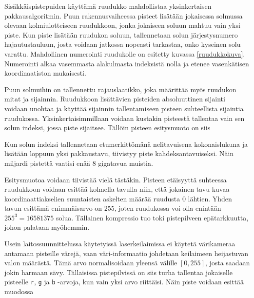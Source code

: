 Sisäkkäispistepuiden käyttämä ruudukko mahdollistaa yksinkertaisen pakkausalgoritmin. Puun rakennusvaiheessa pisteet lisätään jokaisessa solmussa olevaan kolmiulotteiseen ruudukkoon, jonka jokaiseen soluun mahtuu vain yksi piste. Kun piste lisätään ruudukon soluun, tallennetaan solun järjestysnumero hajautustauluun, josta voidaan jatkossa nopeasti tarkastaa, onko kyseinen solu varattu. Mahdollinen numerointi ruudukolle on esitetty kuvassa \ref{ruudukkokuva}. Numerointi alkaa vasemmasta alakulmasta indeksistä nolla ja etenee vasenkätisen koordinaatiston mukaisesti. 

Puun solmuihin on tallennettu rajauslaatikko, joka määrittää myös ruudukon mitat ja sijainnin. Ruudukkoon lisättävien pisteiden absoluuttinen sijainti voidaan unohtaa ja käyttää sijainnin tallentamiseen pisteen suhteellista sijaintia ruudukossa. Yksinkertaisimmillaan voidaan kustakin pisteestä tallentaa vain sen solun indeksi, jossa piste sijaitsee. Tällöin pisteen esitysmuoto on siis


\noindent Kun solun indeksi tallennetaan etumerkittömänä nelitavuisena kokonaislukuna ja lisätään loppuun yksi pakkaustavu, tiivistyy piste kahdeksantavuiseksi. Näin miljardi pistettä vaatisi enää 8 gigatavua muistia. 

Esitysmuotoa voidaan tiivistää vielä tästäkin. Pisteen etäisyyttä suhteessa ruudukkoon voidaan esittää kolmella tavulla niin, että jokainen tavu kuvaa koordinaattiakselien suuntaisten askelten määrää ruudusta 0 lähtien. Yhden tavun esittämä enimmäisarvo on 255, joten ruudukossa voi olla enintään $255^3=16581375$ solua. Tällainen kompressio tuo toki pistepilveen epätarkkuutta, johon palataan myöhemmin. %

Usein laitossuunnittelussa käytetyissä laserkeilaimissa ei käytetä värikameraa antamaan pisteille värejä, vaan väri-informaatio johdetaan keilaimeen heijastuvan valon määrästä. Tämä arvo normalisoidaan yleensä välille $[0,255]$, josta saadaan jokin harmaan sävy. Tällaisissa pistepilvissä on siis turha tallentaa jokaiselle pisteelle \texttt{r}, \texttt{g} ja \texttt{b} -arvoja, kun vain yksi arvo riittäisi. Näin piste voidaan esittää muodossa 

